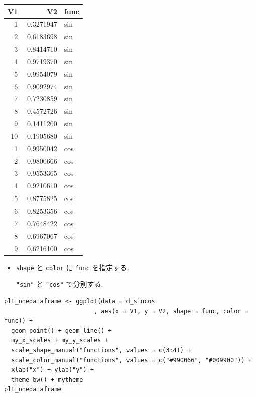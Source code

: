\documentclass[lualatex,a4paper,12pt,report,ja=standard]{bxjsarticle}
\begin{document}
\begin{enumerate}
\begin{center}
\begin{tabular}{rrl}
V1 & V2 & func\\
\hline
1 & 0.3271947 & sin\\
2 & 0.6183698 & sin\\
3 & 0.8414710 & sin\\
4 & 0.9719370 & sin\\
5 & 0.9954079 & sin\\
6 & 0.9092974 & sin\\
7 & 0.7230859 & sin\\
8 & 0.4572726 & sin\\
9 & 0.1411200 & sin\\
10 & -0.1905680 & sin\\
1 & 0.9950042 & cos\\
2 & 0.9800666 & cos\\
3 & 0.9553365 & cos\\
4 & 0.9210610 & cos\\
5 & 0.8775825 & cos\\
6 & 0.8253356 & cos\\
7 & 0.7648422 & cos\\
8 & 0.6967067 & cos\\
9 & 0.6216100 & cos\\
\hline
\end{tabular}
\end{center}

\begin{itemize}
\item \texttt{shape} と \texttt{color} に \texttt{func} を指定する.

\texttt{"sin"} と \texttt{"cos"} で分別する.
\end{itemize}
\begin{verbatim}
plt_onedataframe <- ggplot(data = d_sincos
                         , aes(x = V1, y = V2, shape = func, color = func)) +
  geom_point() + geom_line() +
  my_x_scales + my_y_scales +
  scale_shape_manual("functions", values = c(3:4)) +
  scale_color_manual("functions", values = c("#990066", "#009900")) +
  xlab("x") + ylab("y") +
  theme_bw() + mytheme
plt_onedataframe
\end{verbatim}


\end{enumerate}
\end{document}

